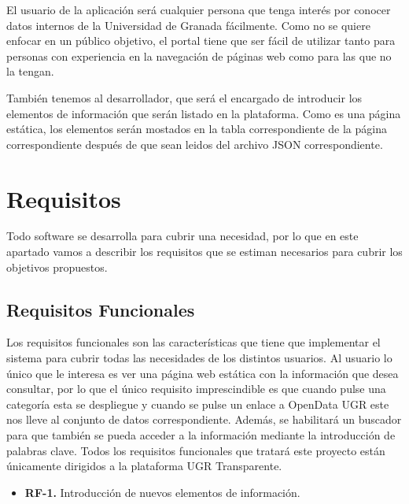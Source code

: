 El usuario de la aplicación será cualquier persona que tenga interés por conocer datos internos de la Universidad de Granada 
fácilmente. Como no se quiere enfocar en un público objetivo, el portal tiene que ser fácil de utilizar tanto para personas 
con experiencia en la navegación de páginas web como para las que no la tengan.

\bigskip
También tenemos al desarrollador, que será el encargado de introducir los elementos de información que serán listado en la
plataforma. Como es una página estática, los elementos serán mostados en la tabla correspondiente de la página correspondiente
después de que sean leidos del archivo JSON correspondiente.

\section{Requisitos}

Todo software se desarrolla para cubrir una necesidad, por lo que en este apartado vamos a describir los requisitos que se 
estiman necesarios para cubrir los objetivos propuestos.

\subsection{Requisitos Funcionales}

Los requisitos funcionales son las características que tiene que implementar el sistema para cubrir todas las necesidades de 
los distintos usuarios. Al usuario lo único que le interesa es ver una página web estática con la información que desea 
consultar, por lo que el único requisito imprescindible es que cuando pulse una categoría esta se despliegue y cuando se 
pulse un enlace a OpenData UGR este nos lleve al conjunto de datos correspondiente. Además, se habilitará un buscador para que
también se pueda acceder a la información mediante la introducción de palabras clave. Todos los requisitos funcionales que 
tratará este proyecto están únicamente dirigidos a la plataforma UGR Transparente.

\begin{itemize}
  \item \textbf{RF-1.} Introducción de nuevos elementos de información.
\end{itemize}

